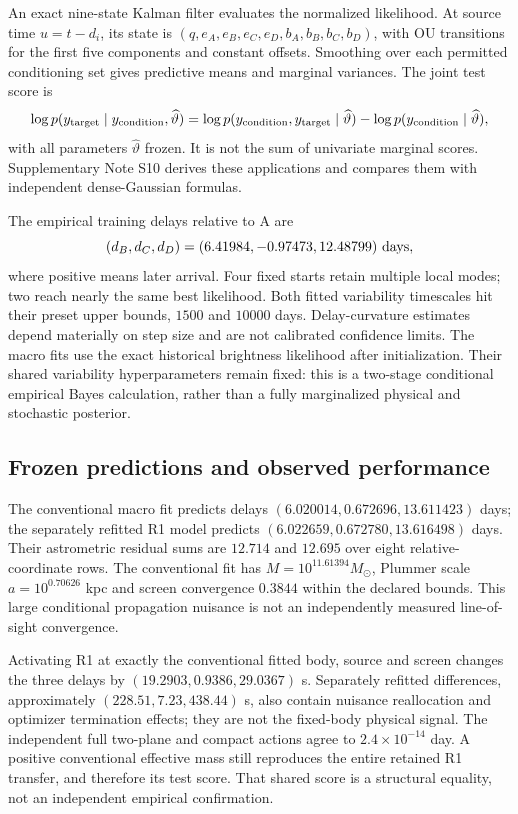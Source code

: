 An exact nine-state Kalman filter evaluates the normalized likelihood.
At source time $u=t-d_i$, its state is
$(q,e_A,e_B,e_C,e_D,b_A,b_B,b_C,b_D)$, with OU transitions for the first
five components and constant offsets. Smoothing over each permitted conditioning set gives
predictive means and marginal variances. The joint test score is
\begin{equation}
 \log p(y_{\rm target}\mid y_{\rm condition},\widehat\vartheta)
 =\log p(y_{\rm condition},y_{\rm target}\mid\widehat\vartheta)
  -\log p(y_{\rm condition}\mid\widehat\vartheta),
 \label{eq:observed-score}
\end{equation}
with all parameters $\widehat\vartheta$ frozen. It is not the sum of
univariate marginal scores. Supplementary Note S10 derives these
applications and compares them with independent dense-Gaussian formulas.

The empirical training delays relative to A are
\[
 (d_B,d_C,d_D)=(6.41984,-0.97473,12.48799)\ {\rm days},
\]
where positive means later arrival. Four fixed starts retain multiple local modes; two reach
nearly the same best likelihood. Both fitted variability timescales hit
their preset upper bounds, $1500$ and $10000$ days. Delay-curvature
estimates depend materially on step size and are not calibrated confidence
limits. The macro fits use the exact historical brightness likelihood
after initialization. Their shared variability hyperparameters remain
fixed: this is a two-stage conditional empirical Bayes calculation,
rather than a fully marginalized physical and stochastic posterior.

\subsection{Frozen predictions and observed performance}
The conventional macro fit predicts delays
$(6.020014,0.672696,13.611423)$ days; the separately refitted R1 model
predicts $(6.022659,0.672780,13.616498)$ days.
Their astrometric residual sums are $12.714$ and $12.695$ over eight
relative-coordinate rows. The conventional fit has
$M=10^{11.61394}M_\odot$, Plummer scale $a=10^{0.70626}$ kpc and
screen convergence $0.3844$ within the declared bounds. This large
conditional propagation nuisance is not an independently measured
line-of-sight convergence.

Activating R1 at exactly the conventional fitted body, source and screen
changes the three delays by $(19.2903,0.9386,29.0367)$ s.
Separately refitted differences, approximately $(228.51,7.23,438.44)$ s,
also contain nuisance reallocation and optimizer termination effects;
they are not the fixed-body physical signal.
The independent full two-plane and compact actions agree to
$2.4\times10^{-14}$ day. A positive conventional effective mass still
reproduces the entire retained R1 transfer, and therefore its test score.
That shared score is a structural equality, not an independent empirical
confirmation.

